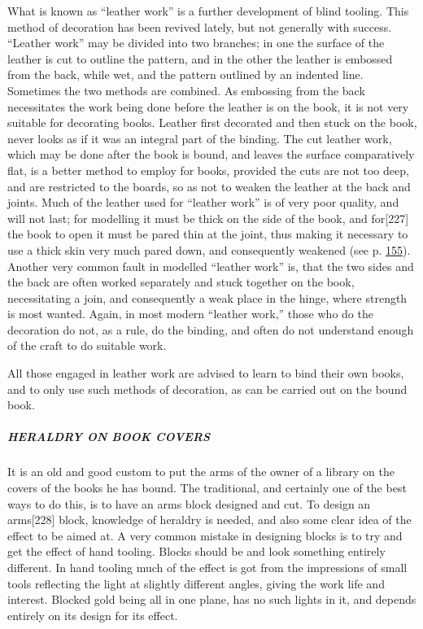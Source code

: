 \documentclass[
]{article}
\begin{document}
What is known as ``leather work'' is a further development of blind
tooling. This method of decoration has been revived lately, but not
generally with success. ``Leather work'' may be divided into two
branches; in one the surface of the leather is cut to outline the
pattern, and in the other the leather is embossed from the back, while
wet, and the pattern outlined by an indented line. Sometimes the two
methods are combined. As embossing from the back necessitates the work
being done before the leather is on the book, it is not very suitable
for decorating books. Leather first decorated and then stuck on the
book, never looks as if it was an integral part of the binding. The cut
leather work, which may be done after the book is bound, and leaves the
surface comparatively flat, is a better method to employ for books,
provided the cuts are not too deep, and are restricted to the boards, so
as not to weaken the leather at the back and joints. Much of the leather
used for ``leather work'' is of very poor quality, and will not last;
for modelling it must be thick on the side of the book, and
for{\protect\hypertarget{Page_227}{}{{[}227{]}}} the book to open it
must be pared thin at the joint, thus making it necessary to use a thick
skin very much pared down, and consequently weakened (see p.
\protect\hyperlink{Page_155}{155}). Another very common fault in
modelled ``leather work'' is, that the two sides and the back are often
worked separately and stuck together on the book, necessitating a join,
and consequently a weak place in the hinge, where strength is most
wanted. Again, in most modern ``leather work,'' those who do the
decoration do not, as a rule, do the binding, and often do not
understand enough of the craft to do suitable work.

All those engaged in leather work are advised to learn to bind their own
books, and to only use such methods of decoration, as can be carried out
on the bound book.

\hypertarget{heraldry-on-book-covers}{%
\subparagraph{HERALDRY ON BOOK COVERS}\label{heraldry-on-book-covers}}

It is an old and good custom to put the arms of the owner of a library
on the covers of the books he has bound. The traditional, and certainly
one of the best ways to do this, is to have an arms block designed and
cut. To design an arms{\protect\hypertarget{Page_228}{}{{[}228{]}}}
block, knowledge of heraldry is needed, and also some clear idea of the
effect to be aimed at. A very common mistake in designing blocks is to
try and get the effect of hand tooling. Blocks should be and look
something entirely different. In hand tooling much of the effect is got
from the impressions of small tools reflecting the light at slightly
different angles, giving the work life and interest. Blocked gold being
all in one plane, has no such lights in it, and depends entirely on its
design for its effect.
\end{document}
